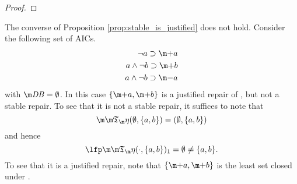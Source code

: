 \begin{proof}
% 
% 
% 
% 
% 
% 
% 
%  
%  
%  
% 
% 
% 
% 
%  
%  
%  
%  
\end{proof}




\begin{example}\label{ex:justified_not_stable}
 The converse of Proposition \ref{prop:stable_is_justified} does not hold. Consider the following set \aics of AICs. 
 \begin{align*}
  \lnot a \aicrule \add a\\
  a\land \lnot b \aicrule \add b\\
  a \land \lnot b \aicrule \remove a
 \end{align*}
 with $\db=\emptyset$. 
 In this case $\{\add a,\add b\}$ is a justified repair of \fulldb, but not a stable repair. 
 To see that it is not a stable repair, it suffices to note that 
 \[\Ap(\emptyset,\{a,b\}) = (\emptyset,\{a,b\})\]
 and hence
 \[
  \lfp \Ap(\cdot,\{a,b\})_1 = \emptyset\neq \{a,b\}.
 \]
To see that it is a justified repair, note that $\{\add a,\add b\}$ is the least set closed under \aics. 
\end{example}

